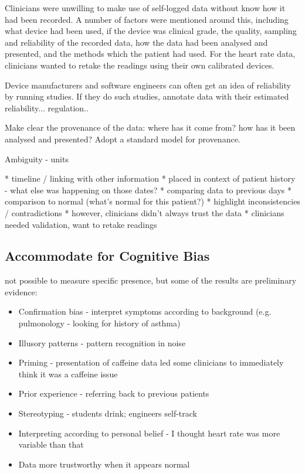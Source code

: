 \documentclass{sigchi}
\begin{document}

Clinicians were unwilling to make use of self-logged data without know how it had been recorded. A number of factors were mentioned around this, including what device had been used, if the device was clinical grade, the quality, sampling and reliability of the recorded data, how the data had been analysed and presented, and the methods which the patient had used. For the heart rate data, clinicians wanted to retake the readings using their own calibrated devices.

Device manufacturers and software engineers can often get an idea of reliability by running studies. If they do such studies, annotate data with their estimated reliability... regulation..

Make clear the provenance of the data: where has it come from? how has it been analysed and presented? Adopt a standard model for provenance.


Ambiguity - units



* timeline / linking with other information
  * placed in context of patient history - what else was happening on those dates?
  * comparing data to previous days
  * comparison to normal (what's normal for this patient?)
  * highlight inconsistencies / contradictions
* however, clinicians didn't always trust the data
  * clinicians needed validation, want to retake readings
 
% 


\subsection{Accommodate for Cognitive Bias}

not possible to measure specific presence, but some of the results are preliminary evidence:
\begin{itemize}
\item  Confirmation bias - interpret symptoms according to background (e.g. pulmonology - looking for history of asthma)
\item  Illusory patterns - pattern recognition in noise
\item  Priming - presentation of caffeine data led some clinicians to immediately think it was a caffeine issue
\item  Prior experience - referring back to previous patients
\item  Stereotyping - students drink; engineers self-track
\item  Interpreting according to personal belief - I thought heart rate was more variable than that
\item  Data more trustworthy when it appears normal
\end{itemize}
\end{document}
